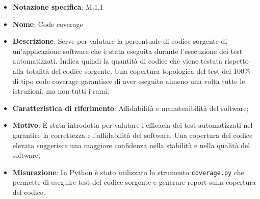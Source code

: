 \begin{itemize}
    \item \textbf{Notazione specifica}: M.1.1
    \item \textbf{Nome}: Code coverage
    \item \textbf{Descrizione}: Serve per valutare la percentuale di codice sorgente di un'applicazione software che è stata eseguita durante l'esecuzione dei test automatizzati. Indica quindi la quantità di codice che viene testata rispetto alla totalità del codice sorgente. Una copertura topologica del test del 100\% di tipo code coverage garantisce di aver eseguito almeno una volta tutte le istruzioni, ma non tutti i rami;
    \item \textbf{Caratteristica di riferimento}: Affidabilità e manutenibilità del software;
    \item \textbf{Motivo}: È stata introdotta per valutare l'efficacia dei test automatizzati nel garantire la correttezza e l'affidabilità del software. Una copertura del codice elevata suggerisce una maggiore confidenza nella stabilità e nella qualità del software;
    \item \textbf{Misurazione}: In Python è stato utilizzato lo strumento \texttt{coverage.py} che permette di eseguire test del codice sorgente e generare report sulla copertura del codice.

\end{itemize}
